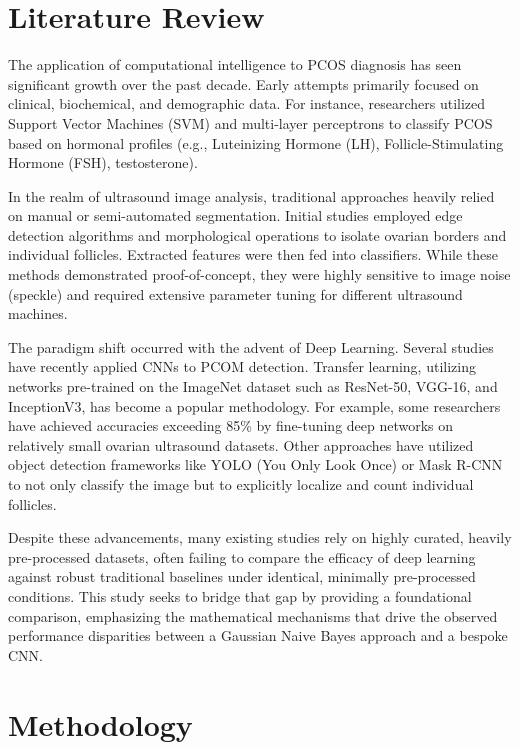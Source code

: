 \documentclass[conference]{IEEEtran}
\begin{document}
\section{Literature Review}
The application of computational intelligence to PCOS diagnosis has seen significant growth over the past decade. Early attempts primarily focused on clinical, biochemical, and demographic data. For instance, researchers utilized Support Vector Machines (SVM) and multi-layer perceptrons to classify PCOS based on hormonal profiles (e.g., Luteinizing Hormone (LH), Follicle-Stimulating Hormone (FSH), testosterone). 

In the realm of ultrasound image analysis, traditional approaches heavily relied on manual or semi-automated segmentation. Initial studies employed edge detection algorithms and morphological operations to isolate ovarian borders and individual follicles. Extracted features were then fed into classifiers. While these methods demonstrated proof-of-concept, they were highly sensitive to image noise (speckle) and required extensive parameter tuning for different ultrasound machines.

The paradigm shift occurred with the advent of Deep Learning. Several studies have recently applied CNNs to PCOM detection. Transfer learning, utilizing networks pre-trained on the ImageNet dataset such as ResNet-50, VGG-16, and InceptionV3, has become a popular methodology. For example, some researchers have achieved accuracies exceeding 85\% by fine-tuning deep networks on relatively small ovarian ultrasound datasets. Other approaches have utilized object detection frameworks like YOLO (You Only Look Once) or Mask R-CNN to not only classify the image but to explicitly localize and count individual follicles.

Despite these advancements, many existing studies rely on highly curated, heavily pre-processed datasets, often failing to compare the efficacy of deep learning against robust traditional baselines under identical, minimally pre-processed conditions. This study seeks to bridge that gap by providing a foundational comparison, emphasizing the mathematical mechanisms that drive the observed performance disparities between a Gaussian Naive Bayes approach and a bespoke CNN.

\section{Methodology}
\end{document}
